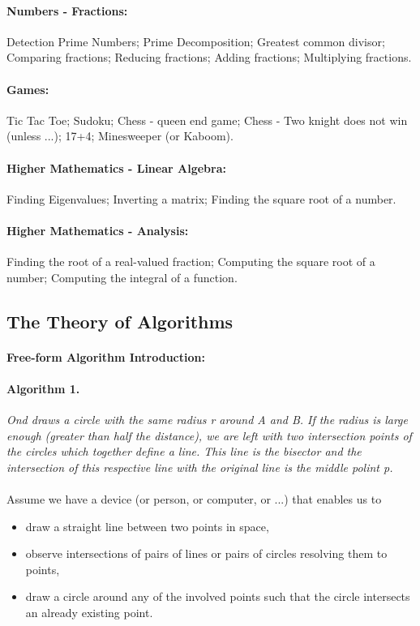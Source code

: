 \documentclass[twocolumn]{article}
\begin{document}
		\paragraph{Numbers - Fractions:}
			Detection Prime Numbers; Prime Decomposition; Greatest common divisor; Comparing fractions; Reducing fractions; Adding fractions; Multiplying fractions.
		\paragraph{Games:}
			Tic Tac Toe; Sudoku; Chess - queen end game; Chess - Two knight does not win (unless ...); 17+4; Minesweeper (or Kaboom).
		\paragraph{Higher Mathematics - Linear Algebra:}
			Finding Eigenvalues; Inverting a matrix; Finding the square root of a number.
		\paragraph{Higher Mathematics - Analysis:}
			Finding the root of a real-valued fraction; Computing the square root of a number; Computing the integral of a function.
	\subsection{The Theory of Algorithms}
		\paragraph{Free-form Algorithm Introduction:}
			\paragraph{Algorithm 1.}
				\textit{Ond draws a circle with the same radius r around A and B. If the radius is large enough (greater than half the distance), we are left with two intersection points of the circles which together define a line. This line is the bisector and the intersection of this respective line with the original line is the middle polint p.}\\\\
				Assume we have a device (or person, or computer, or ...) that enables us to 
				\begin{itemize}
				\item draw a straight line between two points in space,
				\item observe intersections of pairs of lines or pairs of circles resolving them to points,
				\item draw a circle around any of the involved points such that the circle intersects an already existing point.
				\end{itemize}
\end{document}
